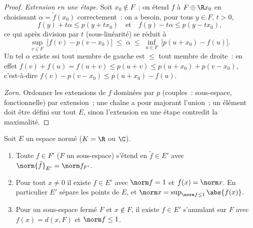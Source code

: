 \begin{proof}
\emph{Extension en une étape.} Soit $x_0 \notin F$~; on étend
$f$ à $F \oplus \R x_0$ en choisissant $\alpha = \tilde
f(x_0)$ correctement~: on a besoin, pour tous $y \in F$, $t >
0$,
\[
f(y) + t\alpha \leq p(y + tx_0)
\quad\text{et}\quad
f(y) - t\alpha \leq p(y - tx_0),
\]
ce qui après division par $t$ (sous-linéarité) se réduit à
\[
\sup_{v \in F}\ \bigl[f(v) - p(v - x_0)\bigr]
\;\leq\; \alpha \;\leq\;
\inf_{u \in F}\ \bigl[p(u + x_0) - f(u)\bigr].
\]
Un tel $\alpha$ existe ssi tout membre de gauche est $\leq$
tout membre de droite~: en effet $f(v) + f(u) = f(u + v) \leq
p(u + v) \leq p(u + x_0) + p(v - x_0)$, c'est-à-dire $f(v) -
p(v - x_0) \leq p(u + x_0) - f(u)$.

\emph{Zorn.} Ordonner les extensions de $f$ dominées par $p$
(couples~: sous-espace, fonctionnelle) par extension~; une
chaîne a pour majorant l'union~; un élément  doit être
défini sur tout $E$, sinon l'extension en une étape contredit
la maximalité.
\end{proof}

\begin{corollary}\label{cor:b3:banach:hbnormed}
Soit $E$ un espace normé ($K = \R$ ou $\C$).
\begin{enumerate}
  \item Toute $f \in F'$ ($F$ un sous-espace) s'étend en
        $\tilde f \in E'$ avec $\norm{\tilde f}_{E'} = \norm
        f_{F'}$.
  \item Pour tout $x \neq 0$ il existe $f \in E'$ avec $\norm
        f = 1$ et $f(x) = \norm x$. En particulier $E'$ sépare
        les points de $E$, et $\norm x = \sup_{\norm f \leq
        1}\abs{f(x)}$.
  \item Pour un sous-espace fermé $F$ et $x \notin F$, il
        existe $f \in E'$ s'annulant sur $F$ avec $f(x) =
        d(x, F)$ et $\norm f \leq 1$.
\end{enumerate}
\end{corollary}

